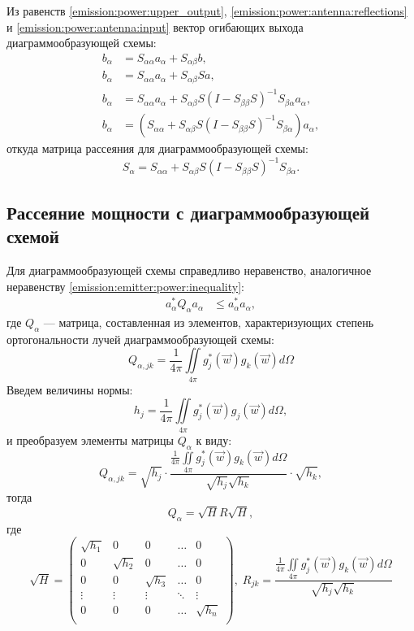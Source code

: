 Из равенств \eqref{emission:power:upper_output}, \eqref{emission:power:antenna:reflections} и \eqref{emission:power:antenna:input} вектор огибающих выхода
диаграммообразующей схемы:
\begin{align*}
    b_\alpha & = S_{\alpha \alpha} a_\alpha + S_{\alpha \beta} b , \\
    b_\alpha & = S_{\alpha \alpha} a_\alpha + S_{\alpha \beta} S a , \\
    b_\alpha & = S_{\alpha \alpha} a_\alpha + S_{\alpha \beta} S ( I - S_{\beta \beta} S )^{-1} S_{\beta \alpha} a_\alpha , \\
    b_\alpha & = ( S_{\alpha \alpha} + S_{\alpha \beta} S ( I - S_{\beta \beta} S )^{-1} S_{\beta \alpha} ) a_\alpha ,
\end{align*}
откуда матрица рассеяния для диаграммообразующей схемы:
\begin{equation}
    \label{emission:power:scheme:reflections}
    S_\alpha = S_{\alpha \alpha} + S_{\alpha \beta} S ( I - S_{\beta \beta} S )^{-1} S_{\beta \alpha} .
\end{equation}


\subsection{Рассеяние мощности с диаграммообразующей схемой}

Для диаграммообразующей схемы справедливо неравенство, аналогичное неравенству \eqref{emission:emitter:power:inequality}:
\begin{align}
    a_\alpha^* Q_\alpha a_\alpha & \le a_\alpha^* a_\alpha , \label{emission:power:scheme:inequality}
\end{align}
где $Q_\alpha$ --- матрица, составленная из элементов, характеризующих степень ортогональности лучей диаграммообразующей схемы:
\[
    Q_{\alpha,jk} = \frac{1}{4 \pi} \iint \limits_{4 \pi} g_{j}^*(\vec{w}) g_{k}(\vec{w}) d \Omega
\]
Введем величины нормы:
\[
    h_j = \frac{1}{4 \pi} \iint \limits_{4 \pi} g_{j}^*(\vec{w}) g_{j}(\vec{w}) d \Omega ,
\]
и преобразуем элементы матрицы $Q_\alpha$ к виду:
\[
    Q_{\alpha,jk}
    =
    \sqrt{h_j}
    \cdot
    \frac{\frac{1}{4 \pi} \iint \limits_{4 \pi} g_j^*(\vec{w}) g_k(\vec{w}) d \Omega}{\sqrt{h_j} \sqrt{h_k}}
    \cdot
    \sqrt{h_k} ,
\]
тогда
\[
    Q_\alpha = \sqrt{H} R \sqrt{H} ,
\]
где
\[
    \sqrt{H}
    = \begin{pmatrix}
          \sqrt{h_1} & 0          & 0          & \dots  & 0          \\
          0          & \sqrt{h_2} & 0          & \dots  & 0          \\
          0          & 0          & \sqrt{h_3} & \dots  & 0          \\
          \vdots     & \vdots     & \vdots     & \ddots & \vdots     \\
          0          & 0          & 0          & \dots  & \sqrt{h_n} \\
    \end{pmatrix} ,
    \;
    R_{jk} = \frac{\frac{1}{4 \pi} \iint \limits_{4 \pi} g_j^*(\vec{w}) g_k(\vec{w}) d \Omega}{\sqrt{h_j} \sqrt{h_k}}
\]

